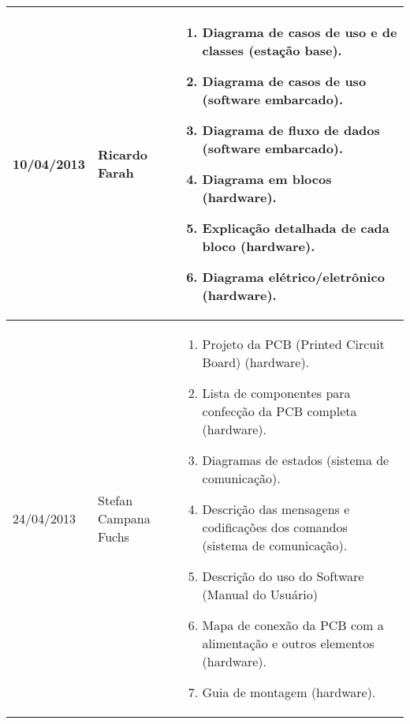 \begin{table}[h]
  \centering
  \begin{tabular}{|p{3cm}|p{4cm}|p{7cm}|}
    10/04/2013 & Ricardo Farah & 
    \begin{enumerate}[topsep=0pt, partopsep=0pt, itemsep=0pt]
      \item Diagrama de casos de uso e de classes (estação base).
      \item Diagrama de casos de uso (software embarcado).
      \item Diagrama de fluxo de dados (software embarcado).
      \item Diagrama em blocos (hardware).
      \item Explicação detalhada de cada bloco (hardware).
      \item Diagrama elétrico/eletrônico (hardware).
    \end{enumerate}\\
    \hline
    24/04/2013 & Stefan Campana Fuchs & 
    \begin{enumerate}[topsep=0pt, partopsep=0pt, itemsep=0pt]
      \item Projeto da PCB (Printed Circuit Board) (hardware).
      \item Lista de componentes para confecção da PCB completa (hardware).
      \item Diagramas de estados (sistema de comunicação).
      \item Descrição das mensagens e codificações dos comandos (sistema de comunicação).
      \item Descrição do uso do Software (Manual do Usuário)
      \item Mapa de conexão da PCB com a alimentação e outros elementos (hardware).
      \item Guia de montagem (hardware).
    \end{enumerate}\\
    \bottomrule
  \end{tabular}%
  \label{tab:deliverables2}%
\end{table}%
